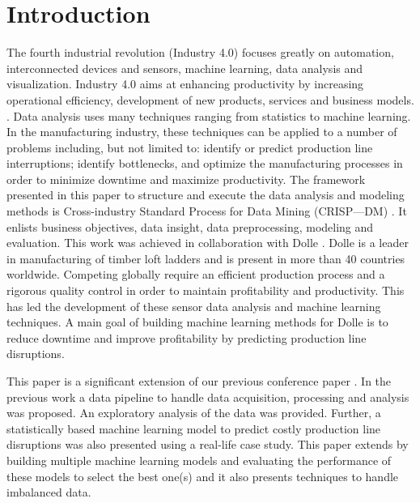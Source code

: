 \documentclass[runningheads]{llncs}
\begin{document}
\section{Introduction}
The fourth industrial revolution (Industry 4.0) focuses greatly on automation, interconnected devices and sensors, machine learning, data analysis and visualization. Industry 4.0 aims at enhancing productivity by increasing operational efficiency, development of new products, services and business models. \cite{industry}. 
Data analysis uses many techniques ranging from statistics to machine learning. In the manufacturing industry, these techniques can be applied to a number  of problems including, but not limited to: identify or predict production line interruptions; identify bottlenecks, and optimize the manufacturing processes in order to minimize downtime and maximize productivity. The framework presented in this paper to structure and execute the data analysis and modeling methods is Cross-industry Standard Process for Data Mining (CRISP—DM) \cite{CRM}. 
It enlists business objectives, data insight, data preprocessing, modeling and evaluation. This work was achieved in collaboration with Dolle \cite{Dolle}. 
Dolle is a leader in manufacturing of timber loft ladders and is present in more than 40 countries worldwide. Competing globally require an efficient production process and a rigorous quality control in order to maintain profitability and productivity. This has led the development of these sensor data analysis and machine learning techniques. A main goal of building machine learning methods for Dolle is to reduce downtime and improve profitability by predicting production line disruptions.

This paper is a significant extension of our previous conference paper \cite{nadeem}. In the previous work a data pipeline to handle data acquisition, processing and analysis was proposed. An exploratory analysis of the data was provided. Further, a statistically based machine learning model to predict costly production line disruptions was also presented using a real-life case study. This paper extends \cite{nadeem} by building multiple machine learning models and evaluating the performance of these models to select the best one(s) and it also presents techniques to handle imbalanced data.
\end{document}
